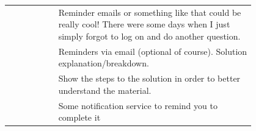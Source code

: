 \begin{longtable}{r|p{0.8\linewidth}}
		& Reminder emails or something like that could be really cool! There were some days when I just simply forgot to log on and do another question.                                                                                                                                                                                                                                                                                                                                                                                                                                                                                                                                                                                                   \\
		& Reminders via email (optional of course). Solution explanation/breakdown.                                                                                                                                                                                                                                                                                                                                                                                                                                                                                                                                                                                                                                                                        \\
		& Show the steps to the solution in order to better understand the material.                                                                                                                                                                                                                                                                                                                                                                                                                                                                                                                                                                                                                                                                       \\
		& Some notification service to remind you to complete it                                                                                                                                                                                                                                                                                                                                                                                                                                                                                                                                                                                                                                                                                           \\

\end{longtable}
